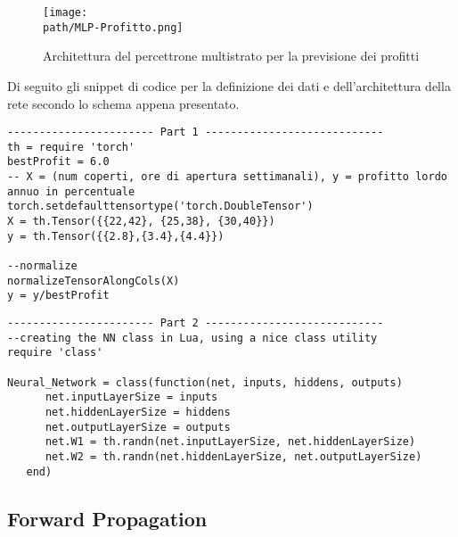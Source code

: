 \begin{figure}[h!]
 \centering
 \texttt{[image: \\path/MLP-Profitto.png]}
 \caption{Architettura del percettrone multistrato per la previsione dei profitti}
 \label{fig:mlp}
\end{figure}

Di seguito gli snippet di codice per la definizione dei dati e dell'architettura della rete secondo lo schema appena presentato. 

\begin{lstlisting}[language={[5.2]Lua}]
----------------------- Part 1 ----------------------------
th = require 'torch'
bestProfit = 6.0
-- X = (num coperti, ore di apertura settimanali), y = profitto lordo annuo in percentuale
torch.setdefaulttensortype('torch.DoubleTensor')
X = th.Tensor({{22,42}, {25,38}, {30,40}})
y = th.Tensor({{2.8},{3.4},{4.4}})

--normalize
normalizeTensorAlongCols(X)
y = y/bestProfit

\end{lstlisting}

\begin{lstlisting}[language={[5.2]Lua}]
----------------------- Part 2 ----------------------------
--creating the NN class in Lua, using a nice class utility
require 'class'

Neural_Network = class(function(net, inputs, hiddens, outputs)
      net.inputLayerSize = inputs
      net.hiddenLayerSize = hiddens
      net.outputLayerSize = outputs
      net.W1 = th.randn(net.inputLayerSize, net.hiddenLayerSize)
      net.W2 = th.randn(net.hiddenLayerSize, net.outputLayerSize)
   end)
\end{lstlisting}

\subsection{Forward Propagation}


